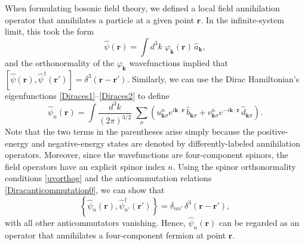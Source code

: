 \documentclass[pra,12pt]{revtex4}
\begin{document}
When formulating bosonic field theory, we defined a local field
annihilation operator that annihilates a particle at a given point
$\mathbf{r}$.  In the infinite-system limit, this took the form
\begin{equation}
  \hat{\psi}(\mathbf{r})
  = \int d^3k \; \varphi_{\mathbf{k}}(\mathbf{r}) \, \hat{a}_{\mathbf{k}},
\end{equation}
and the orthonormality of the $\varphi_{\mathbf{k}}$ wavefunctions
implied that $[\hat{\psi}(\mathbf{r}),
  \hat{\psi}^\dagger(\mathbf{r}')] =
\delta^3(\mathbf{r}-\mathbf{r}')$.  Similarly, we can use the Dirac
Hamiltonian's eigenfunctions \eqref{Diraces1}--\eqref{Diraces2} to
define
\begin{equation}
  \hat{\psi}_n(\mathbf{r})
  = \int \frac{d^3k}{(2\pi)^{3/2}} \; \sum_\sigma
  \left(
  u^n_{\mathbf{k}\sigma} e^{i\mathbf{k}\cdot\mathbf{r}} \, \hat{b}_{\mathbf{k}\sigma}
  + v^n_{\mathbf{k}\sigma} e^{-i\mathbf{k}\cdot\mathbf{r}} \, \hat{d}_{\mathbf{k}\sigma}\right).
  \label{Diracpsi0}
\end{equation}
Note that the two terms in the parentheses arise simply because the
positive-energy and negative-energy states are denoted by
differently-labeled annihilation operators.  Moreover, since the
wavefunctions are four-component spinors, the field operators have an
explicit spinor index $n$.  Using the spinor orthonormality conditions
\eqref{uvorthog} and the anticommutation relations
\eqref{Diracanticommutation0}, we can show that
\begin{equation}
  \left\{\hat{\psi}_n(\mathbf{r}), \hat{\psi}_{n'}^{\dagger}(\mathbf{r}')\right\}
  = \delta_{nn'}\, \delta^3(\mathbf{r}-\mathbf{r}'),
\end{equation}
with all other anticommutators vanishing.  Hence,
$\hat{\psi}_n(\mathbf{r})$ can be regarded as an operator that
annihilates a four-component fermion at point $\mathbf{r}$.
\end{document}
